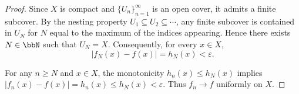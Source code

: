 \begin{proof}
    Since $X$ is compact and $\{U_n\}_{n=1}^\infty$ is an open cover, it admits a finite subcover. By the nesting property $U_1 \subseteq U_2 \subseteq \cdots$, any finite subcover is contained in $U_N$ for $N$ equal to the maximum of the indices appearing. Hence there exists $N \in \bbN$ such that $U_N = X$. Consequently, for every $x \in X$,
    $$
    |f_N(x) - f(x)| = h_N(x) < \varepsilon.
    $$

    For any $n \geq N$ and $x \in X$, the monotonicity $h_n(x) \leq h_N(x)$ implies $|f_n(x) - f(x)| = h_n(x) \leq h_N(x) < \varepsilon$. Thus $f_n \to f$ uniformly on $X$.
\end{proof}